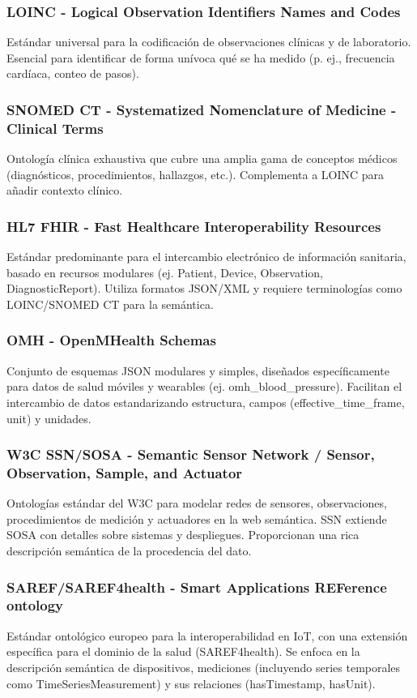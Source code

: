 \subsubsection{LOINC - Logical Observation Identifiers Names and Codes}
Estándar universal para la codificación de observaciones clínicas y de laboratorio. Esencial para identificar de forma unívoca qué se ha medido (p. ej., frecuencia cardíaca, conteo de pasos).

\subsubsection{SNOMED CT - Systematized Nomenclature of Medicine - Clinical Terms}
Ontología clínica exhaustiva que cubre una amplia gama de conceptos médicos (diagnósticos, procedimientos, hallazgos, etc.). Complementa a LOINC para añadir contexto clínico. \cite{SNOMEDCT}

\subsubsection{HL7 FHIR  - Fast Healthcare Interoperability Resources}
Estándar predominante para el intercambio electrónico de información sanitaria, basado en recursos modulares (ej. Patient, Device, Observation, DiagnosticReport). Utiliza formatos JSON/XML y requiere terminologías como LOINC/SNOMED CT para la semántica. \cite{HL7FHIR} 

\subsubsection{OMH - OpenMHealth Schemas}
Conjunto de esquemas JSON modulares y simples, diseñados específicamente para datos de salud móviles y wearables (ej. omh\_blood\_pressure). Facilitan el intercambio de datos estandarizando estructura, campos (effective\_time\_frame, unit) y unidades. \cite{OpenmHealth}

\subsubsection{W3C SSN/SOSA - Semantic Sensor Network / Sensor, Observation, Sample, and Actuator}
Ontologías estándar del W3C para modelar redes de sensores, observaciones, procedimientos de medición y actuadores en la web semántica. SSN extiende SOSA con detalles sobre sistemas y despliegues. Proporcionan una rica descripción semántica de la procedencia del dato. \cite{SSN/SOSA}

\subsubsection{SAREF/SAREF4health - Smart Applications REFerence ontology}
Estándar ontológico europeo para la interoperabilidad en IoT, con una extensión específica para el dominio de la salud (SAREF4health). Se enfoca en la descripción semántica de dispositivos, mediciones (incluyendo series temporales como TimeSeriesMeasurement) y sus relaciones (hasTimestamp, hasUnit). \cite{SAREF4health}

